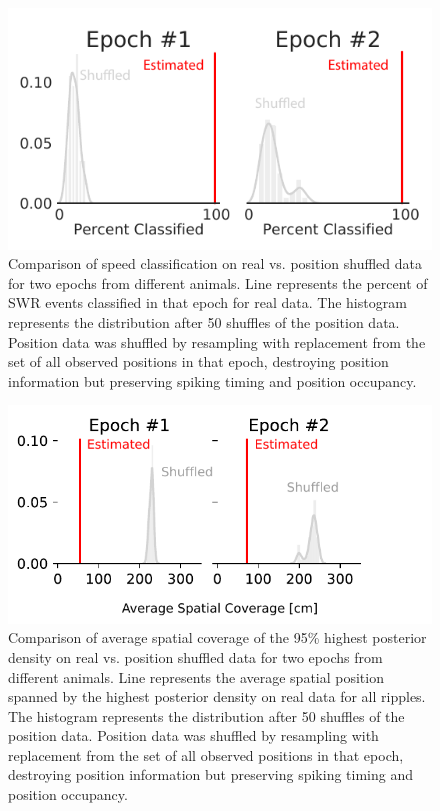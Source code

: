 \documentclass[times, twoside]{zHenriquesLab-StyleBioRxiv}
\begin{document}
\begin{figure}%
\centering
\includegraphics[width=0.80\linewidth]{figures/Figure3-supplemental2/Figure3_v2-supplemental2}
\caption{Comparison of speed classification on real vs. position shuffled data for two epochs from different animals. Line represents the percent of SWR events classified in that epoch for real data. The histogram represents the distribution after 50 shuffles of the position data. Position data was shuffled by resampling with replacement from the set of all observed positions in that epoch, destroying position information but preserving spiking timing and position occupancy.}
\label{fig:Figure3-Figure supplement 2}
\end{figure}


\begin{figure}%
\centering
\includegraphics[width=0.80\linewidth]{figures/Figure4-supplemental1/Figure4_v1-supplemental1}
\caption{Comparison of average spatial coverage of the 95\% highest posterior density on real vs. position shuffled data for two epochs from different animals. Line represents the average spatial position spanned by the highest posterior density on real data for all ripples. The histogram represents the distribution after 50 shuffles of the position data. Position data was shuffled by resampling with replacement from the set of all observed positions in that epoch, destroying position information but preserving spiking timing and position occupancy.}
\label{fig:Figure4-Figure supplement 1}
\end{figure}

\end{document}
